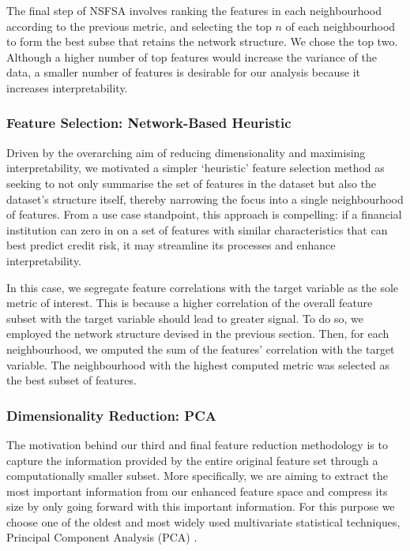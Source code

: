 \documentclass{article}
\begin{document}
The final step of NSFSA involves ranking the features in each neighbourhood according to the previous metric, and selecting the top $n$ of each neighbourhood to form the best subse that retains the network structure. We chose the top two. Although a higher number of top features would increase the variance of the data, a smaller number of features is desirable for our analysis because it increases interpretability. 

\subsubsection{Feature Selection: Network-Based Heuristic}

Driven by the overarching aim of reducing dimensionality and maximising interpretability, we motivated a simpler `heuristic' feature selection method as seeking to not only summarise the set of features in the dataset but also the dataset's structure itself, thereby narrowing the focus into a single neighbourhood of features. From a use case standpoint, this approach is compelling: if a financial institution can zero in on a set of features with similar characteristics that can best predict credit risk, it may streamline its processes and enhance interpretability. 

In this case, we segregate feature correlations with the target variable as the sole metric of interest. This is because a higher correlation of the overall feature subset with the target variable should lead to greater signal. To do so,  we employed the network structure devised in the previous section. Then, for each neighbourhood, we omputed the sum of the features' correlation with the target variable. The neighbourhood with the highest computed metric was selected as the best subset of features. 

\subsubsection{Dimensionality Reduction: PCA}

The motivation behind our third and final feature reduction methodology is to capture the information provided by the entire original feature set through a computationally smaller subset. More specifically, we are aiming to extract the most important information from our enhanced feature space and compress its size by only going forward with this important information. For this purpose we choose one of the oldest and most widely used multivariate statistical techniques, Principal Component Analysis (PCA) \cite{abdi2010principal}.
\end{document}
